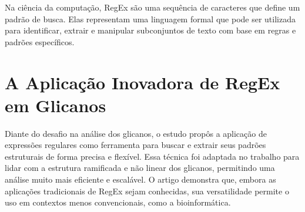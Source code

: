 Na ciência da computação, RegEx são uma sequência de caracteres que define um padrão de busca. Elas representam uma linguagem formal que pode ser utilizada para identificar, extrair e manipular subconjuntos de texto com base em regras e padrões específicos.

\section{A Aplicação Inovadora de RegEx em Glicanos}

Diante do desafio  na análise dos glicanos, o estudo propôs a aplicação de expressões regulares como ferramenta para buscar e extrair seus padrões estruturais de forma precisa e flexível. Essa técnica foi adaptada no trabalho para lidar com a estrutura ramificada e não linear dos glicanos, permitindo uma análise muito mais eficiente e escalável. O artigo demonstra que, embora as aplicações tradicionais de RegEx sejam conhecidas, sua versatilidade permite o uso em contextos menos convencionais, como a bioinformática.